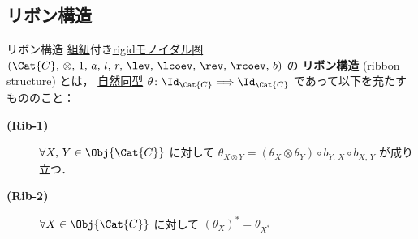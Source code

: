 \documentclass[TQFT_main]{subfiles}
\begin{document}
\subsection{リボン構造}

\begin{mydef}[label=def:ribbon]{リボン構造}
    \hyperref[redef:braided-monoidal]{組紐}付き\hyperref[redef:rigid]{rigidモノイダル圏} $(\Cat{C},\, \otimes,\, 1,\, a,\, l,\, r,\, \lev,\, \lcoev,\, \rev,\, \rcoev,\, b)$ の
    \textbf{リボン構造} (ribbon structure) とは，
    \hyperref[def:nat]{自然同型} $\theta \colon \Id_{\Cat{C}} \Longrightarrow \Id_{\Cat{C}}$ であって以下を充たすもののこと：
    \begin{description}
        \item[\textbf{(Rib-1)}] $\forall X,\, Y \in \Obj{\Cat{C}}$ に対して $\theta_{X \otimes Y} = (\theta_{X} \otimes \theta_{Y}) \circ b_{Y,\, X} \circ b_{X,\, Y}$ が成り立つ．
        \item[\textbf{(Rib-2)}] $\forall X \in \Obj{\Cat{C}}$ に対して $(\theta_X)^* = \theta_{X^*}$
    \end{description}
\end{mydef}
\end{document}
